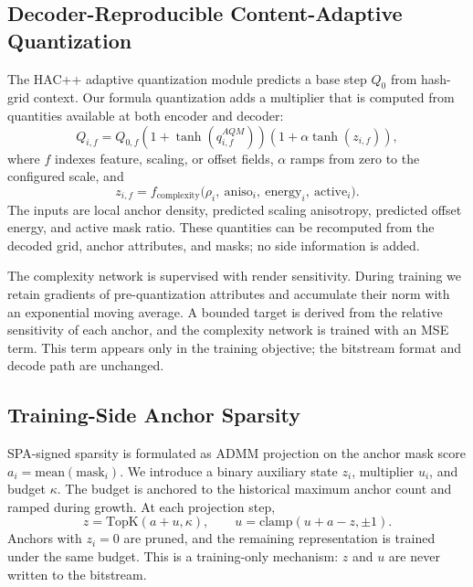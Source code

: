 \documentclass{article}
\begin{document}
\subsection{Decoder-Reproducible Content-Adaptive Quantization}
The HAC++ adaptive quantization module predicts a base step $Q_0$ from hash-grid context. Our formula quantization adds a multiplier that is computed from quantities available at both encoder and decoder:
\begin{equation}
Q_{i,f}=Q_{0,f}\left(1+\tanh(q_{i,f}^{AQM})\right)\left(1+\alpha\tanh(z_{i,f})\right),
\end{equation}
where $f$ indexes feature, scaling, or offset fields, $\alpha$ ramps from zero to the configured scale, and
\begin{equation}
z_{i,f}=f_{\mathrm{complexity}}\big(\rho_i,\ \mathrm{aniso}_i,\ \mathrm{energy}_i,\ \mathrm{active}_i\big).
\end{equation}
The inputs are local anchor density, predicted scaling anisotropy, predicted offset energy, and active mask ratio. These quantities can be recomputed from the decoded grid, anchor attributes, and masks; no side information is added.

The complexity network is supervised with render sensitivity. During training we retain gradients of pre-quantization attributes and accumulate their norm with an exponential moving average. A bounded target is derived from the relative sensitivity of each anchor, and the complexity network is trained with an MSE term. This term appears only in the training objective; the bitstream format and decode path are unchanged.

\subsection{Training-Side Anchor Sparsity}
SPA-signed sparsity is formulated as ADMM projection on the anchor mask score $a_i=\mathrm{mean}(\mathrm{mask}_i)$. We introduce a binary auxiliary state $z_i$, multiplier $u_i$, and budget $\kappa$. The budget is anchored to the historical maximum anchor count and ramped during growth. At each projection step,
\begin{equation}
z=\mathrm{TopK}\left(a+u,\kappa\right),\qquad
u=\mathrm{clamp}\left(u+a-z,\pm1\right).
\end{equation}
Anchors with $z_i=0$ are pruned, and the remaining representation is trained under the same budget. This is a training-only mechanism: $z$ and $u$ are never written to the bitstream.
\end{document}
